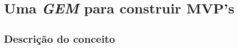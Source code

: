 \chapter{Uma \emph{GEM} para construir MVP's}
\label{cap:texto}

\section{Descrição do conceito}
\label{sec:figs} 



